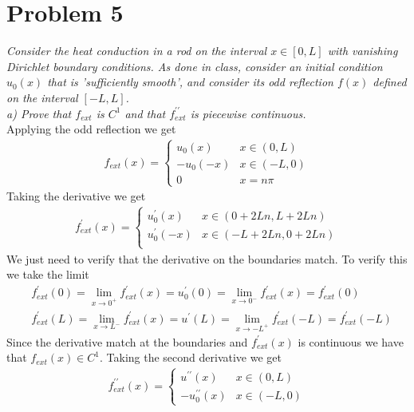 \documentclass[12pt]{article}
\theoremstyle{remark}
\begin{document}
\newpage

\section*{Problem 5}

\textit{Consider the heat conduction in a rod on the interval $x \in [0,L]$ with vanishing Dirichlet boundary conditions. As done in class, consider an initial condition $u_0(x)$ that is 'sufficiently smooth', and consider its odd reflection $f(x)$ defined on the interval $[-L,L]$.} \\

\textit{a) Prove that $f_{ext}$ is $C^1$ and that $f^{\prime\prime}_{ext}$ is piecewise continuous.} \\

Applying the odd reflection we get 
\begin{align*}
	f_{ext}(x) = 
	\begin{cases}
	u_0(x) & x \in (0,L) \\
	-u_0(-x) & x \in (-L,0) \\
	0 & x = n\pi
	\end{cases}
\end{align*}
Taking the derivative we get 
\begin{align*}
	f^\prime_{ext}(x) = 
	\begin{cases}
	u^\prime_0(x) & x \in (0 + 2Ln,L + 2Ln) \\
	u^\prime_0(-x) & x \in (-L + 2Ln,0 + 2Ln) \\
	\end{cases}
\end{align*}
We just need to verify that the derivative on the boundaries match. To verify this we take the limit
\begin{align*}
	& f^\prime_{ext}(0) = \lim_{x \rightarrow 0^+} f^\prime_{ext}(x) = u^\prime_0(0) = \lim_{x \rightarrow 0^-} f_{ext}^\prime(x) = f^\prime_{ext}(0) \\
	& f^\prime_{ext}(L) = \lim_{x \rightarrow L^-} f^\prime_{ext}(x) = u^\prime(L) = \lim_{x \rightarrow -L^+} f^\prime_{ext}(-L) = f^\prime_{ext}(-L)
\end{align*}
Since the derivative match at the boundaries and $f^\prime_{ext}(x)$ is continuous we have that $f_{ext}(x) \in C^1$. Taking the second derivative we get 
\begin{align*}
	f^{\prime\prime}_{ext}(x) = 
	\begin{cases}
	u^{\prime\prime}(x) & x \in (0,L) \\
	-u^{\prime\prime}_0(x) & x \in (-L,0)
	\end{cases}
\end{align*}
\end{document}
